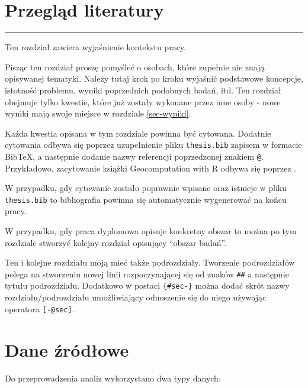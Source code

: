 \documentclass{amuthesis}
\begin{document}

\hypertarget{sec-lit}{%
\chapter{Przegląd literatury}\label{sec-lit}}

\begin{center}\rule{0.5\linewidth}{0.5pt}\end{center}

Ten rozdział zawiera wyjaśnienie kontekstu pracy.

Pisząc ten rozdział proszę pomyśleć o osobach, które zupełnie nie znają
opisywanej tematyki. Należy tutaj krok po kroku wyjaśnić podstawowe
koncepcje, istotność problemu, wyniki poprzednich podobnych badań, itd.
Ten rozdział obejmuje tylko kwestie, które już zostały wykonane przez
inne osoby - nowe wyniki mają swoje miejsce w rozdziale
\ref{sec-wyniki}.

Każda kwestia opisana w tym rozdziale powinna być cytowana. Dodatnie
cytowania odbywa się poprzez uzupełnienie pliku \texttt{thesis.bib}
zapisem w formacie BibTeX, a następnie dodanie nazwy referencji
poprzedzonej znakiem \texttt{@}. Przykładowo, zacytowanie książki
Geocomputation with R odbywa się poprzez
\autocite{lovelace_geocomputation_2019}.

W przypadku, gdy cytowanie zostało poprawnie wpisane oraz istnieje w
pliku \texttt{thesis.bib} to bibliografia powinna się automatycznie
wygenerować na końcu pracy.

W przypadku, gdy praca dyplomowa opisuje konkretny obszar to można po
tym rozdziale stworzyć kolejny rozdział opisujący ``obszar badań''.

Ten i kolejne rozdziału moją mieć także podrozdziały. Tworzenie
podrozdziałów polega na stworzeniu nowej linii rozpoczynającej się od
znaków \texttt{\#\#} a następnie tytułu podrozdziału. Dodatkowo w
postaci \texttt{\{\#sec-\}} można dodać skrót nazwy
rozdziału/podrozdziału umożliwiający odnoszenie się do niego używając
operatora \texttt{{[}-@sec{]}}.


\hypertarget{sec-dane}{%
\chapter{Dane źródłowe}\label{sec-dane}}

Do przeprowadzenia analiz wykorzystano dwa typy danych:
\end{document}
